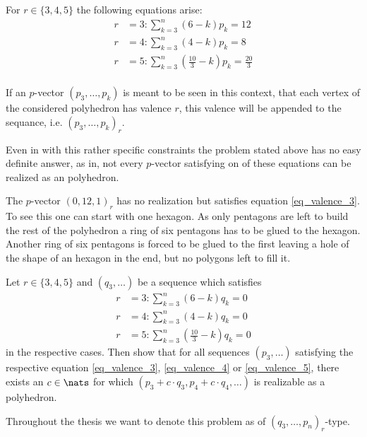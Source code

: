 For $r \in \{3, 4, 5\}$ the following equations arise:
\begin{align}
  r &= 3: \sum_{k=3}^n \left(6 - k \right) p_k = 12 \label{eq_valence_3}\\
  r &= 4: \sum_{k=3}^n \left(4 - k \right) p_k = 8  \label{eq_valence_4}\\
  r &= 5: \sum_{k=3}^n \left( \frac{10}{3} - k \right) p_k = \frac{20}{3} \label{eq_valence_5}\\
\end{align}
\begin{notation}
  If an $p$-vector $(p_3, \dots, p_k)$ is meant to be seen in this context, that each vertex of the considered polyhedron has valence $r$, this valence will be appended to the sequance, i.e. $(p_3, \dots, p_k)_r$.
\end{notation}
Even in with this rather specific constraints the problem stated above has no easy definite answer, as in, not every $p$-vector satisfying on of these equations can be realized as an polyhedron.
\begin{example}
  The $p$-vector $(0, 12, 1)_r$ has no realization but satisfies equation \ref{eq_valence_3}. To see this one can start with one hexagon. As only pentagons are left to build the rest of the polyhedron a ring of six pentagons has to be glued to the hexagon. Another ring of six pentagons is forced to be glued to the first leaving a hole of the shape of an hexagon in the end, but no polygons left to fill it.
\end{example}

\begin{problem}
  Let $r \in \{3, 4, 5\}$ and $(q_3, \dots)$ be a sequence which satisfies 
  \begin{align}
    r &= 3: \sum_{k=3}^n \left( 6            - k \right) q_k = 0 \label{eq_zero_curv_3}\\
    r &= 4: \sum_{k=3}^n \left( 4            - k \right) q_k = 0 \label{eq_zero_curv_4}\\
    r &= 5: \sum_{k=3}^n \left( \frac{10}{3} - k \right) q_k = 0 \label{eq_zero_curv_5}
  \end{align}
  in the respective cases. Then show that for all sequences $(p_3, \dots)$  satisfying the respective equation \ref{eq_valence_3}, \ref{eq_valence_4} or \ref{eq_valence_5}, there exists an $c \in \nats$ for which $(p_3 + c \cdot q_3, p_4 + c \cdot q_4, \dots)$ is realizable as a polyhedron.
\end{problem}
\begin{notation}
  Throughout the thesis we want to denote this problem as of $(q_3, \dots, p_n)_r$-type.
\end{notation}

